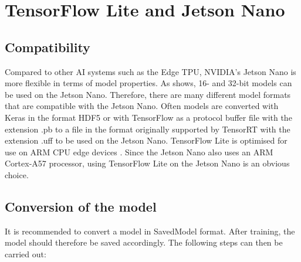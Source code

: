 %
%
%



\section{TensorFlow Lite and Jetson Nano}


\subsection{Compatibility}

Compared to other AI systems such as the Edge TPU, NVIDIA's Jetson Nano is more flexible in terms of model properties. As \cite{Stock.07.01.2021} shows, 16- and 32-bit models can be used on the Jetson Nano. Therefore, there are many different model formats that are compatible with the Jetson Nano. Often models are converted with Keras in the format HDF5 or with TensorFlow as a protocol buffer file with the extension .pb to a file in the format originally supported by TensorRT with the extension .uff to be used on the Jetson Nano. %
TensorFlow Lite is optimised for use on ARM CPU edge devices \cite{Jain:2020}. Since the Jetson Nano also uses an ARM Cortex-A57 processor, using TensorFlow Lite on the Jetson Nano is an obvious choice.

\subsection{Conversion of the model}

It is recommended to convert a model in SavedModel format. After training, the model should therefore be saved accordingly. The following steps can then be carried out:

\medskip


    




